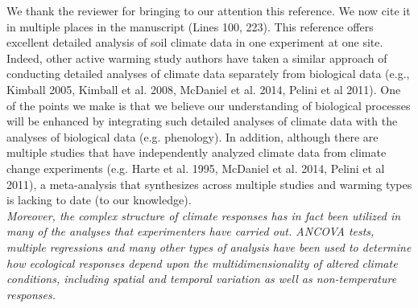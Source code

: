 \documentclass[11pt,a4paper]{letter}
\begin{document}
\begin{letter}{}
We thank the reviewer for bringing to our attention this reference. We now cite it in multiple places in the manuscript (Lines 100, 223). This reference offers excellent detailed analysis of soil climate data in one experiment at one site. Indeed, other active warming study authors have taken a similar approach of conducting detailed analyses of climate data separately from biological data (e.g., Kimball 2005, Kimball et al. 2008, McDaniel et al. 2014, Pelini et al 2011). One of the points we make is that we believe our understanding of biological processes will be enhanced by integrating such detailed analyses of climate data with the analyses of biological data (e.g. phenology). In addition, although there are multiple studies that have independently analyzed climate data from climate change experiments (e.g. Harte et al. 1995, McDaniel et al. 2014, Pelini et al 2011), a meta-analysis that synthesizes across multiple studies and warming types is lacking to date (to our knowledge).\\

\emph{Moreover, the complex structure of climate responses has in fact been utilized in many of the analyses that experimenters have carried out.  ANCOVA tests, multiple regressions and many other types of analysis have been used to determine how ecological responses depend upon the multidimensionality of altered climate conditions, including spatial and temporal variation as well as non-temperature responses.}


\end{letter}
\end{document}
